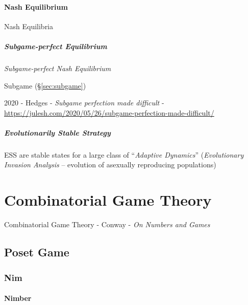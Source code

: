 \paragraph{Nash Equilibrium}\label{sec:nash_equilibrium}\hfill

Nash Equilibria



\subparagraph{Subgame-perfect Equilibrium}\label{sec:subgame_perfect}\hfill

\emph{Subgame-perfect Nash Equilibrium}

Subgame (\S\ref{sec:subgame})

2020 - Hedges - \emph{Subgame perfection made difficult} -
\url{https://julesh.com/2020/05/26/subgame-perfection-made-difficult/}



\subparagraph{Evolutionarily Stable Strategy}
\label{sec:evolutionarily_stable}\hfill

ESS are stable states for a large class of ``\emph{Adaptive Dynamics}''
(\emph{Evolutionary Invasion Analysis} -- evolution of asexually reproducing
populations)




\section{Combinatorial Game Theory}\label{sec:combinatorial_game_theory}

Combinatorial Game Theory - Conway  - \emph{On Numbers and Games}



\subsection{Poset Game}\label{sec:poset_game}

\subsubsection{Nim}\label{sec:nim}

\paragraph{Nimber}\label{sec:nimber}\hfill

